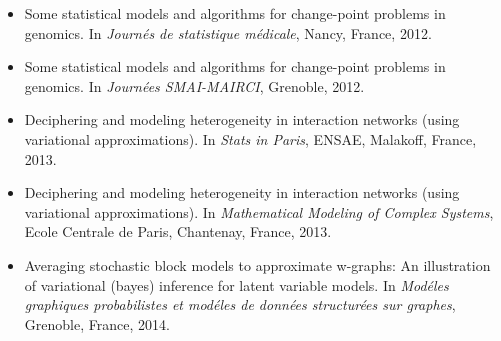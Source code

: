 \begin{itemize}





\item
\newblock Some statistical models and algorithms for change-point problems in
  genomics.
\newblock In {\em Journ\'es de statistique m\'edicale}, Nancy, France, 2012.

\item
\newblock Some statistical models and algorithms for change-point problems in
  genomics.
\newblock In {\em Journ\'ees SMAI-MAIRCI}, Grenoble, 2012.

\item
\newblock Deciphering and modeling heterogeneity in interaction networks (using
  variational approximations).
\newblock In {\em Stats in {P}aris}, ENSAE, Malakoff, France, 2013.

\item
\newblock Deciphering and modeling heterogeneity in interaction networks (using
  variational approximations).
\newblock In {\em Mathematical Modeling of Complex Systems}, Ecole Centrale de
  Paris, Chantenay, France, 2013.

\item
\newblock Averaging stochastic block models to approximate w-graphs: An
  illustration of variational (bayes) inference for latent variable models.
\newblock In {\em Mod\'eles graphiques probabilistes et mod\'eles de donn\'ees
  structur\'ees sur graphes}, Grenoble, France, 2014.

\end{itemize}

